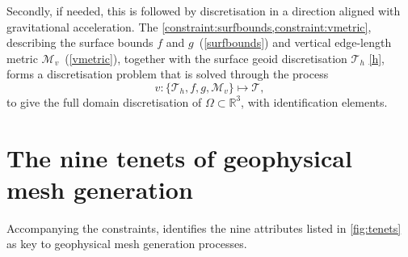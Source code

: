 \documentclass[a4paper, 10pt]{book}
\providecommand{\eqref}[1]{(\ref{#1})}
\begin{document}
Secondly, if needed, this is followed by discretisation in a direction aligned with gravitational acceleration.
%
The
\cref{constraint:surfbounds,constraint:vmetric},
describing the
surface bounds $f$ and $g$~\eqref{surfbounds}
and 
vertical edge-length metric $\mathcal{M}_v$~\eqref{vmetric},
together with
the surface geoid discretisation $\mathcal{T}_h$ \cref{h},
forms a discretisation problem that is solved through the process
\begin{equation}
v\!: \{\mathcal{T}_h, f, g, \mathcal{M}_v\} \mapsto \mathcal{T},
\label{v}
\end{equation}
%
to give the full domain discretisation of $\Omega \subset \mathbb{R}^3$, with identification elements.


\chapter{The nine tenets of geophysical mesh generation}
\label{sec:tenets}
%
Accompanying the constraints, \cite{candybrep} identifies the nine attributes listed in \cref{fig:tenets} as key to geophysical mesh generation processes.
%
\end{document}

